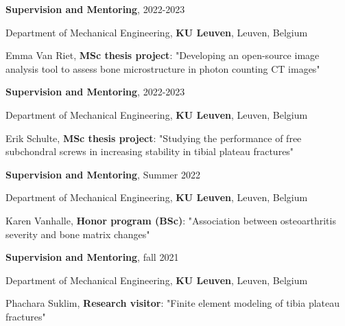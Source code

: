 \documentclass[8pt]{article}
\newcommand{\halfblankline}{\quad\vspace{-0.5\baselineskip}\pagebreak[3]}
\begin{document}
\halfblankline






\textbf{Supervision and Mentoring}, {2022-2023}
\begin{innerlist}
	\item[] {Department of Mechanical Engineering}, {\textbf{KU Leuven}}, Leuven, Belgium
	\begin{innerlist}
		\item[] {Emma Van Riet, }\textbf{MSc thesis project}{:}  {"Developing an open-source image analysis tool to assess bone microstructure in photon counting CT images"}
		
	\end{innerlist}
\end{innerlist}

\halfblankline


\textbf{Supervision and Mentoring}, {2022-2023}
\begin{innerlist}
	\item[] {Department of Mechanical Engineering}, {\textbf{KU Leuven}}, Leuven, Belgium
	\begin{innerlist}
		\item[] {Erik Schulte, }\textbf{MSc thesis project}{:}  {"Studying the performance of free subchondral screws in increasing stability in tibial plateau fractures"}
		
	\end{innerlist}
\end{innerlist}

\halfblankline

\textbf{Supervision and Mentoring}, { Summer 2022}
\begin{innerlist}
	\item[] {Department of Mechanical Engineering}, {\textbf{KU Leuven}}, Leuven, Belgium
	\begin{innerlist}
		\item[] {Karen Vanhalle, }\textbf{Honor program (BSc)}{:}  {"Association between osteoarthritis severity and bone matrix changes"}
		
	\end{innerlist}
\end{innerlist}

\halfblankline

\textbf{Supervision and Mentoring}, {fall 2021}
\begin{innerlist}
	\item[] {Department of Mechanical Engineering}, {\textbf{KU Leuven}}, Leuven, Belgium
	\begin{innerlist}
		\item[] {Phachara Suklim, }\textbf{Research visitor}{:}  {"Finite element modeling of tibia plateau fractures"}
		
	\end{innerlist}
\end{innerlist}
\end{document}
